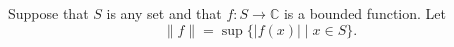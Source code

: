 Suppose that $S$ is any set and that $f: S \to \mathbb{C}$ is a bounded function. Let
$$
\|f\| = \sup \{|f(x)| \mid x \in S\}.
$$
